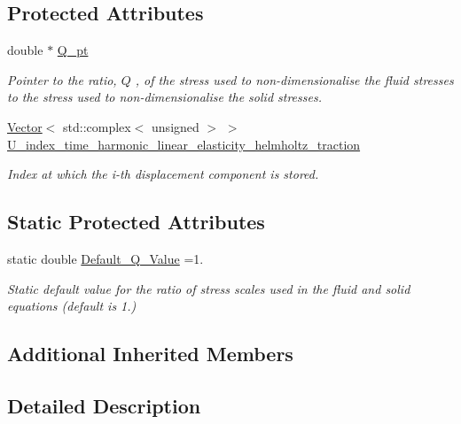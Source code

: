 \subsection*{Protected Attributes}
\begin{DoxyCompactItemize}
\item 
double $\ast$ \hyperlink{classoomph_1_1TimeHarmonicLinElastLoadedByPMLHelmholtzPressureBCElement_aa45224393afa639869972fdf77384e63}{Q\+\_\+pt}
\begin{DoxyCompactList}\small\item\em Pointer to the ratio, $ Q $ , of the stress used to non-\/dimensionalise the fluid stresses to the stress used to non-\/dimensionalise the solid stresses. \end{DoxyCompactList}\item 
\hyperlink{classoomph_1_1Vector}{Vector}$<$ std\+::complex$<$ unsigned $>$ $>$ \hyperlink{classoomph_1_1TimeHarmonicLinElastLoadedByPMLHelmholtzPressureBCElement_a07cd6f158abf744ab24011d0d0a8a010}{U\+\_\+index\+\_\+time\+\_\+harmonic\+\_\+linear\+\_\+elasticity\+\_\+helmholtz\+\_\+traction}
\begin{DoxyCompactList}\small\item\em Index at which the i-\/th displacement component is stored. \end{DoxyCompactList}\end{DoxyCompactItemize}
\subsection*{Static Protected Attributes}
\begin{DoxyCompactItemize}
\item 
static double \hyperlink{classoomph_1_1TimeHarmonicLinElastLoadedByPMLHelmholtzPressureBCElement_a0f3bb2e8a6d9efe816f766b5e946f9c7}{Default\+\_\+\+Q\+\_\+\+Value} =1.
\begin{DoxyCompactList}\small\item\em Static default value for the ratio of stress scales used in the fluid and solid equations (default is 1.) \end{DoxyCompactList}\end{DoxyCompactItemize}
\subsection*{Additional Inherited Members}


\subsection{Detailed Description}
